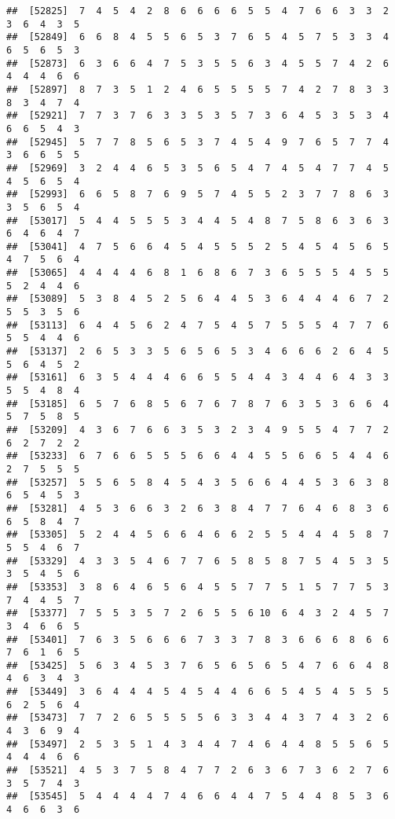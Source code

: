 \documentclass[
]{book}
\begin{document}
\begin{verbatim}
##  [52825]  7  4  5  4  2  8  6  6  6  6  5  5  4  7  6  6  3  3  2  3  6  4  3  5
##  [52849]  6  6  8  4  5  5  6  5  3  7  6  5  4  5  7  5  3  3  4  6  5  6  5  3
##  [52873]  6  3  6  6  4  7  5  3  5  5  6  3  4  5  5  7  4  2  6  4  4  4  6  6
##  [52897]  8  7  3  5  1  2  4  6  5  5  5  5  7  4  2  7  8  3  3  8  3  4  7  4
##  [52921]  7  7  3  7  6  3  3  5  3  5  7  3  6  4  5  3  5  3  4  6  6  5  4  3
##  [52945]  5  7  7  8  5  6  5  3  7  4  5  4  9  7  6  5  7  7  4  3  6  6  5  5
##  [52969]  3  2  4  4  6  5  3  5  6  5  4  7  4  5  4  7  7  4  5  4  5  6  5  4
##  [52993]  6  6  5  8  7  6  9  5  7  4  5  5  2  3  7  7  8  6  3  3  5  6  5  4
##  [53017]  5  4  4  5  5  5  3  4  4  5  4  8  7  5  8  6  3  6  3  6  4  6  4  7
##  [53041]  4  7  5  6  6  4  5  4  5  5  5  2  5  4  5  4  5  6  5  4  7  5  6  4
##  [53065]  4  4  4  4  6  8  1  6  8  6  7  3  6  5  5  5  4  5  5  5  2  4  4  6
##  [53089]  5  3  8  4  5  2  5  6  4  4  5  3  6  4  4  4  6  7  2  5  5  3  5  6
##  [53113]  6  4  4  5  6  2  4  7  5  4  5  7  5  5  5  4  7  7  6  5  5  4  4  6
##  [53137]  2  6  5  3  3  5  6  5  6  5  3  4  6  6  6  2  6  4  5  5  6  4  5  2
##  [53161]  6  3  5  4  4  4  6  6  5  5  4  4  3  4  4  6  4  3  3  5  5  4  8  4
##  [53185]  6  5  7  6  8  5  6  7  6  7  8  7  6  3  5  3  6  6  4  5  7  5  8  5
##  [53209]  4  3  6  7  6  6  3  5  3  2  3  4  9  5  5  4  7  7  2  6  2  7  2  2
##  [53233]  6  7  6  6  5  5  5  6  6  4  4  5  5  6  6  5  4  4  6  2  7  5  5  5
##  [53257]  5  5  6  5  8  4  5  4  3  5  6  6  4  4  5  3  6  3  8  6  5  4  5  3
##  [53281]  4  5  3  6  6  3  2  6  3  8  4  7  7  6  4  6  8  3  6  6  5  8  4  7
##  [53305]  5  2  4  4  5  6  6  4  6  6  2  5  5  4  4  4  5  8  7  5  5  4  6  7
##  [53329]  4  3  3  5  4  6  7  7  6  5  8  5  8  7  5  4  5  3  5  3  5  4  5  6
##  [53353]  3  8  6  4  6  5  6  4  5  5  7  7  5  1  5  7  7  5  3  7  4  4  5  7
##  [53377]  7  5  5  3  5  7  2  6  5  5  6 10  6  4  3  2  4  5  7  3  4  6  6  5
##  [53401]  7  6  3  5  6  6  6  7  3  3  7  8  3  6  6  6  8  6  6  7  6  1  6  5
##  [53425]  5  6  3  4  5  3  7  6  5  6  5  6  5  4  7  6  6  4  8  4  6  3  4  3
##  [53449]  3  6  4  4  4  5  4  5  4  4  6  6  5  4  5  4  5  5  5  6  2  5  6  4
##  [53473]  7  7  2  6  5  5  5  5  6  3  3  4  4  3  7  4  3  2  6  4  3  6  9  4
##  [53497]  2  5  3  5  1  4  3  4  4  7  4  6  4  4  8  5  5  6  5  4  4  4  6  6
##  [53521]  4  5  3  7  5  8  4  7  7  2  6  3  6  7  3  6  2  7  6  3  5  7  4  3
##  [53545]  5  4  4  4  4  7  4  6  6  4  4  7  5  4  4  8  5  3  6  4  6  6  3  6

\end{verbatim}
\end{document}
